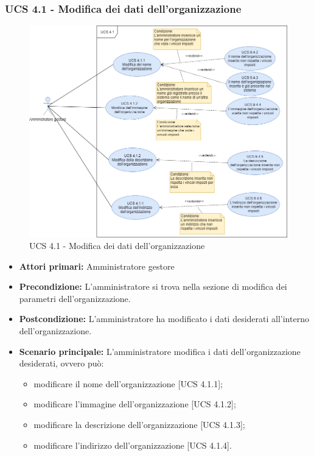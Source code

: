 \subsubsection{UCS 4.1 - Modifica dei dati dell'organizzazione}%
\begin{figure}[h]
	\centering
    \includegraphics[scale=0.53]{sezioni/UseCase/Immagini/UCS4.1.png}
    \caption{UCS 4.1 - Modifica dei dati dell'organizzazione}
\end{figure}
\begin{itemize}
    \item \textbf{Attori primari:} Amministratore gestore
    \item \textbf{Precondizione:} L'amministratore si trova nella sezione di modifica dei parametri dell'organizzazione.
    \item \textbf{Postcondizione:} L'amministratore ha modificato i dati desiderati all'interno dell'organizzazione.
    \item \textbf{Scenario principale:} L'amministratore modifica i dati dell'organizzazione desiderati, ovvero può:
    \begin{itemize}
        \item modificare il nome dell'organizzazione [UCS 4.1.1];
        \item modificare l'immagine dell'organizzazione [UCS 4.1.2];
        \item modificare la descrizione dell'organizzazione [UCS 4.1.3];
        \item modificare l'indirizzo dell'organizzazione [UCS 4.1.4].
    \end{itemize}
\end{itemize}

